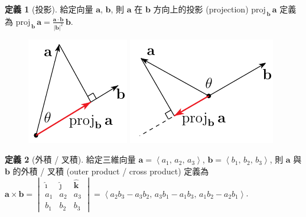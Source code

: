 \documentclass[12pt]{extarticle}
\newcommand{\ds}{\displaystyle}
\newcommand{\llt}{\left\langle}
\newcommand{\rgt}{\right\rangle}
\newcommand{\proj}[2]{\mathrm{proj}_{\,#2}\,#1}
\theoremstyle{definition}
\newtheorem*{dfn}{定義}
\newcommand{\va}{\mathbf{a}}
\newcommand{\vb}{\mathbf{b}}
\newcommand{\hi}{\widehat{\pmb{\imath}}}
\newcommand{\hj}{\widehat{\pmb{\jmath}}}
\newcommand{\hk}{\widehat{\mathbf{k}}}
\begin{document}
\begin{dfn}[投影] 
  給定向量 $\va$, $\vb$, 則 $\va$ 在 $\vb$ 方向上的投影 (projection) $\ds\proj{\va}{\vb}$ 定義為 $\ds\proj{\va}{\vb} = \frac{\va\cdot\vb}{|\vb|^2}\,\vb$. 
\end{dfn}

\begin{figure}[!htbp]
  \centering
  \includegraphics[scale=1,page=1]{fig/projA.pdf}
  \qquad\qquad
  \includegraphics[scale=1,page=1]{fig/projB.pdf}
\end{figure}

\vspace{-5mm}
\begin{dfn}[外積 / 叉積] 
  給定三維向量 $\va = \llt a_1,\,a_2,\,a_3\rgt$, $\vb = \llt b_1,\,b_2,\,b_3\rgt$, 則 $\va$ 與 $\vb$ 的外積 / 叉積 (outer product / cross product) 定義為 $\ds\va\times\vb = \begin{vmatrix}\hi & \hj & \hk \\ a_1 & a_2 & a_3 \\ b_1 & b_2 & b_3\end{vmatrix} = \llt a_2b_3 - a_3b_2,\,a_3b_1 - a_1b_3,\,a_1b_2 - a_2b_1\rgt$. 
\end{dfn}
\end{document}
